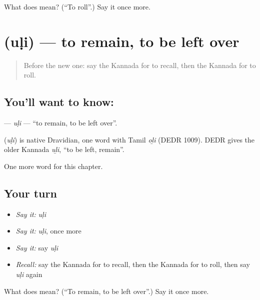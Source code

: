 \begin{tcolorbox}[breakable,colback=teal!4,colframe=teal!35!black,title={Before you move on}]
What does  mean? (\textquotedblleft{}To roll\textquotedblright{}.) Say it once more.
\end{tcolorbox}
\section[\texorpdfstring{\kn{ಉಳಿ} (uḷi)}{ಉಳಿ (uḷi)}]{ (uḷi) — to remain, to be left over}

\label{lesson:KA-C165-uli}



\begin{quote}
Before the new one: say the Kannada for to recall, then the Kannada for to roll.
\end{quote}

\subsection*{You'll want to know: }
\textbf{} — \emph{uḷi} — \textquotedblleft{}to remain, to be left over\textquotedblright{}.

\begin{cousinweb}
\textbf{} (\emph{uḷi}) is native Dravidian, one word with Tamil \emph{oḻi} (DEDR 1009). DEDR gives the older Kannada \emph{uḻi}, \textquotedblleft{}to be left, remain\textquotedblright{}.
\end{cousinweb}

\begin{grammarlens}[title={What you've built}]
One more word for this chapter.
\end{grammarlens}

\subsection*{Your turn}
\begin{itemize}
\raggedright
  \item \emph{Say it:} \emph{uḷi}
  \item \emph{Say it:} \emph{uḷi}, once more
  \item \emph{Say it:} say \emph{uḷi}
  \item \emph{Recall:} say the Kannada for to recall, then the Kannada for to roll, then say \emph{uḷi} again
\end{itemize}

\begin{tcolorbox}[breakable,colback=teal!4,colframe=teal!35!black,title={Before you move on}]
What does  mean? (\textquotedblleft{}To remain, to be left over\textquotedblright{}.) Say it once more.
\end{tcolorbox}
